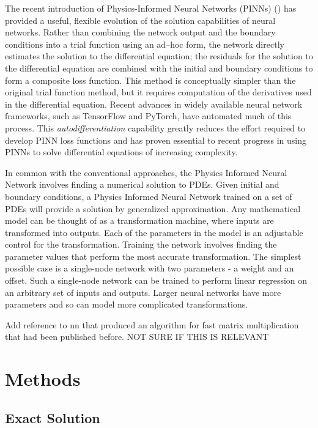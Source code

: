 \documentclass[]{article}
\begin{document}
The recent introduction of Physics-Informed Neural Networks (PINNs) (\cite{Raissi2019}) has provided a useful, flexible evolution of the solution capabilities of neural networks. Rather than combining the network output and the boundary conditions into a trial function using an ad--hoc form, the network directly estimates the solution to the differential equation; the residuals for the solution to the differential equation are combined with the initial and boundary conditions to form a composite loss function. This method is conceptually simpler than the original trial function method, but it requires computation of the derivatives used in the differential equation. Recent advances in widely available neural network frameworks, such as TensorFlow and PyTorch, have automated much of this process. This \textit{autodifferentiation} capability greatly reduces the effort required to develop PINN loss functions and has proven essential to recent progress in using PINNs to solve differential equations of increasing complexity.

In common with the conventional approaches, the Physics Informed Neural Network involves finding a numerical solution to PDEs. Given initial and boundary conditions, a Physics Informed Neural Network trained on a set of PDEs will provide a solution by generalized approximation. Any mathematical model can be thought of as a transformation machine, where inputs are transformed into outputs. Each of the parameters in the model is an adjustable control for the transformation. Training the network involves finding the parameter values that perform the most accurate transformation. The simplest possible case is a single-node network with two parameters - a weight and an offset. Such a single-node network can be trained to perform linear regression on an arbitrary set of inputs and outputs. Larger neural networks have more parameters and so can model more complicated transformations.

Add reference to nn that produced an algorithm for fast matrix multiplication that had been published before. NOT SURE IF THIS IS RELEVANT

\section{Methods}

\subsection{Exact Solution}
\end{document}
